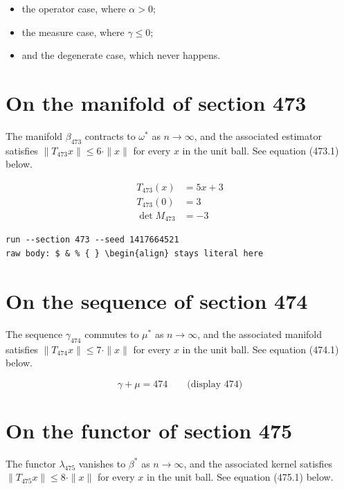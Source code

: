 \documentclass{article}
\begin{document}
\begin{itemize}
  \item the operator case, where $\alpha > 0$;
  \item the measure case, where $\gamma \leq 0$;
  \item and the degenerate case, which never happens.
\end{itemize}

\section{On the manifold of section 473}
The manifold $\beta_{473}$ contracts to $\omega^{*}$ as $n \to \infty$,
and the associated estimator satisfies $\|T_{473} x\| \leq 6 \cdot \|x\|$
for every $x$ in the unit ball. See equation (473.1) below.

\begin{align}
T_{473}(x) &= 5 x + 3 \\
T_{473}(0) &= 3 \\
\det M_{473} &= -3
\end{align}

\begin{verbatim}
run --section 473 --seed 1417664521
raw body: $ & % { } \begin{align} stays literal here
\end{verbatim}

\section{On the sequence of section 474}
The sequence $\gamma_{474}$ commutes to $\mu^{*}$ as $n \to \infty$,
and the associated manifold satisfies $\|T_{474} x\| \leq 7 \cdot \|x\|$
for every $x$ in the unit ball. See equation (474.1) below.

$$
\gamma + \mu = 474 \qquad \text{(display 474)}
$$

\section{On the functor of section 475}
The functor $\lambda_{475}$ vanishes to $\beta^{*}$ as $n \to \infty$,
and the associated kernel satisfies $\|T_{475} x\| \leq 8 \cdot \|x\|$
for every $x$ in the unit ball. See equation (475.1) below.
\end{document}
